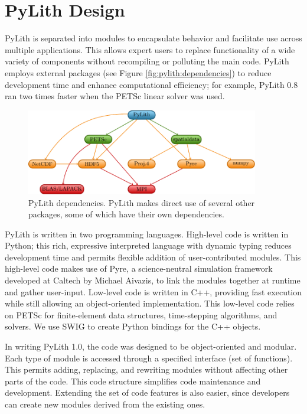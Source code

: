 \chapter{PyLith Design}
\label{cha:design}

PyLith is separated into modules to encapsulate behavior and facilitate
use across multiple applications. This allows expert users to replace
functionality of a wide variety of components without recompiling
or polluting the main code. PyLith employs external packages (see
Figure \vref{fig:pylith:dependencies}) to reduce development time
and enhance computational efficiency; for example, PyLith 0.8 ran
two times faster when the PETSc linear solver was used.

\begin{figure}[htbp]
  \includegraphics[width=4in]{implementation/figs/packages}
  \caption{PyLith dependencies. PyLith makes direct use of several
    other packages, some of which have their own dependencies.}
  \label{fig:pylith:dependencies}
\end{figure}

PyLith is written in two programming languages. High-level code is
written in Python; this rich, expressive interpreted language with
dynamic typing reduces development time and permits flexible addition
of user-contributed modules. This high-level code makes use of Pyre, a
science-neutral simulation framework developed at Caltech by Michael
Aivazis, to link the modules together at runtime and gather
user-input. Low-level code is written in C++, providing fast execution
while still allowing an object-oriented implementation. This low-level
code relies on PETSc for finite-element data structures, time-stepping
algorithms, and solvers. We use SWIG to create Python bindings for the
C++ objects.

In writing PyLith 1.0, the code was designed to be object-oriented and
modular. Each type of module is accessed through a specified interface
(set of functions). This permits adding, replacing, and rewriting
modules without affecting other parts of the code. This code structure
simplifies code maintenance and development. Extending the set of code
features is also easier, since developers can create new modules
derived from the existing ones.

